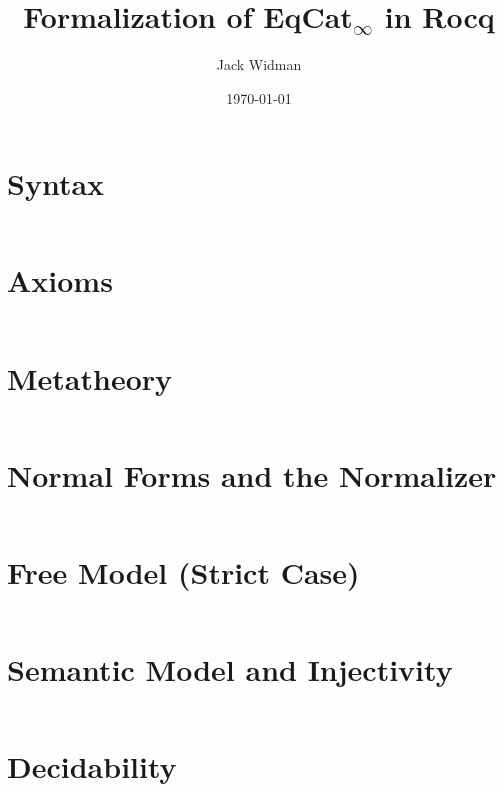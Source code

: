 \documentclass[11pt]{article}
\title{Formalization of EqCat$_\infty$ in Rocq}
\author{Jack Widman}
\date{\today}
\begin{document}
\maketitle

\section{Syntax}
\inputminted{coq}{Syntax.v}

\section{Axioms}
\inputminted{coq}{Axioms.v}

\section{Metatheory}
\inputminted{coq}{Meta.v}

\section{Normal Forms and the Normalizer}
\inputminted{coq}{NormalForm.v}

\section{Free Model (Strict Case)}
\inputminted{coq}{FreeModel.v}

\section{Semantic Model and Injectivity}
\inputminted{coq}{Model.v}

\section{Decidability}
\inputminted{coq}{Decidable.v}
\end{document}
